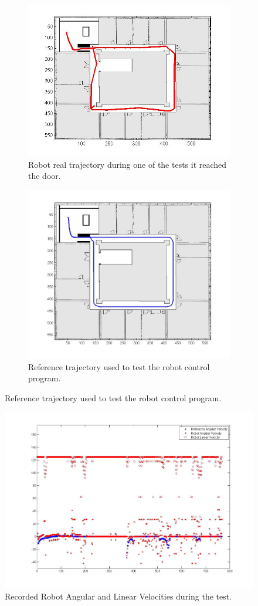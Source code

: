\documentclass[11pt,a4paper]{scrartcl}
\begin{document}
	\begin{figure}[H]
      \centering
      \begin{subfigure}{.5\textwidth}
          \centering
          \includegraphics[width=0.7\linewidth]{field_test_robot_trajectory.jpg}
          \caption{Robot real trajectory during one of the tests it reached the door.}
          \label{fig:field_test_result}
      \end{subfigure}%
      \begin{subfigure}{.5\textwidth}
          \centering
          \includegraphics[width=0.7\linewidth]{field_test_reference_trajectory.jpg}
          \caption{Reference trajectory used to test the robot control program.}
          \label{fig:field_test_reference_trajectory}
      \end{subfigure}
	\end{figure}

	\begin{figure}[H]
        \centering
        \includegraphics[width=0.7\linewidth]{field_test_velocities.jpg}
        \caption{Recorded Robot Angular and Linear Velocities during the test.}
        \label{fig:field_test_velocities}
    \end{figure}
\end{document}
